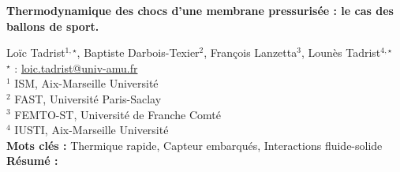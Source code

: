 


    \newpage

\BgThispage

%
\begin{flushleft}
\addtocounter{section}{1}
{\Large \textbf{Thermodynamique des chocs d'une membrane pressurisée : le cas des ballons de sport.}}\label{ref:22}
\end{flushleft}
%
Loïc Tadrist$^{1,\star}$, Baptiste Darbois-Texier$^{2}$, François Lanzetta$^{3}$, Lounès Tadrist$^{4,\star}$\\[2mm]
$^{\star}$ \Letter : \url{loic.tadrist@univ-amu.fr}\\[2mm]
{\footnotesize $^{1}$ ISM, Aix-Marseille Université}\\
{\footnotesize $^{2}$ FAST, Université Paris-Saclay}\\
{\footnotesize $^{3}$ FEMTO-ST, Université de Franche Comté}\\
{\footnotesize $^{4}$ IUSTI, Aix-Marseille Université}\\
[4mm]
%
\noindent \textbf{Mots clés : } Thermique rapide, Capteur embarqués, Interactions fluide-solide\\[4mm]
%
\noindent \textbf{Résumé : } 

